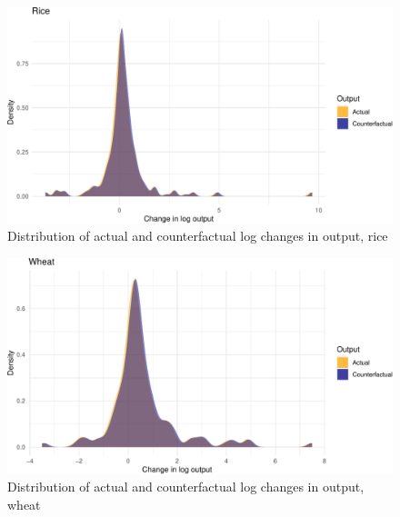 \documentclass[
]{article}
\begin{document}
\FloatBarrier
\newpage

\begin{landscape}
\begin{figure}
\includegraphics{draft_files/figure-latex/yield9counterfactual1-1} \caption[Distribution of actual and counterfactual log changes in output, rice]{Distribution of actual and counterfactual log changes in output, rice}\label{fig:yield9counterfactual1}
\end{figure}
\end{landscape}

\FloatBarrier
\newpage

\begin{landscape}
\begin{figure}
\includegraphics{draft_files/figure-latex/yield9counterfactual2-1} \caption[Distribution of actual and counterfactual log changes in output, wheat]{Distribution of actual and counterfactual log changes in output, wheat}\label{fig:yield9counterfactual2}
\end{figure}
\end{landscape}

\FloatBarrier
\newpage
\end{document}
